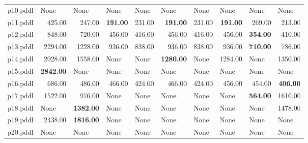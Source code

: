 \documentclass{article}
\begin{document}
\begin{tabular}{@{}lrrrrrrrrr@{}}
p10.pddl & \multicolumn{1}{|l|}{None} & \multicolumn{1}{|l|}{None} & \multicolumn{1}{|l|}{None} & \multicolumn{1}{|l|}{None} & \multicolumn{1}{|l|}{None} & \multicolumn{1}{|l|}{None} & \multicolumn{1}{|l|}{None} & \multicolumn{1}{|l|}{None} & \multicolumn{1}{|l|}{None} \\
p11.pddl & 425.00 & 247.00 & \textbf{191.00} & 231.00 & \textbf{191.00} & 231.00 & \textbf{191.00} & 269.00 & 213.00 \\
p12.pddl & 848.00 & 720.00 & 456.00 & 416.00 & 456.00 & 416.00 & 456.00 & \textbf{354.00} & 410.00 \\
p13.pddl & 2294.00 & 1228.00 & 936.00 & 838.00 & 936.00 & 838.00 & 936.00 & \textbf{710.00} & 786.00 \\
p14.pddl & 2028.00 & 1558.00 & \multicolumn{1}{|l|}{None} & \multicolumn{1}{|l|}{None} & \textbf{1280.00} & \multicolumn{1}{|l|}{None} & 1284.00 & \multicolumn{1}{|l|}{None} & 1350.00 \\
p15.pddl & \textbf{2842.00} & \multicolumn{1}{|l|}{None} & \multicolumn{1}{|l|}{None} & \multicolumn{1}{|l|}{None} & \multicolumn{1}{|l|}{None} & \multicolumn{1}{|l|}{None} & \multicolumn{1}{|l|}{None} & \multicolumn{1}{|l|}{None} & \multicolumn{1}{|l|}{None} \\
p16.pddl & 686.00 & 486.00 & 466.00 & 424.00 & 466.00 & 424.00 & 456.00 & 454.00 & \textbf{406.00} \\
p17.pddl & 1522.00 & 976.00 & \multicolumn{1}{|l|}{None} & \multicolumn{1}{|l|}{None} & \multicolumn{1}{|l|}{None} & \multicolumn{1}{|l|}{None} & \multicolumn{1}{|l|}{None} & \textbf{564.00} & 1610.00 \\
p18.pddl & \multicolumn{1}{|l|}{None} & \textbf{1382.00} & \multicolumn{1}{|l|}{None} & \multicolumn{1}{|l|}{None} & \multicolumn{1}{|l|}{None} & \multicolumn{1}{|l|}{None} & \multicolumn{1}{|l|}{None} & \multicolumn{1}{|l|}{None} & 1478.00 \\
p19.pddl & 2438.00 & \textbf{1816.00} & \multicolumn{1}{|l|}{None} & \multicolumn{1}{|l|}{None} & \multicolumn{1}{|l|}{None} & \multicolumn{1}{|l|}{None} & \multicolumn{1}{|l|}{None} & \multicolumn{1}{|l|}{None} & \multicolumn{1}{|l|}{None} \\
p20.pddl & \multicolumn{1}{|l|}{None} & \multicolumn{1}{|l|}{None} & \multicolumn{1}{|l|}{None} & \multicolumn{1}{|l|}{None} & \multicolumn{1}{|l|}{None} & \multicolumn{1}{|l|}{None} & \multicolumn{1}{|l|}{None} & \multicolumn{1}{|l|}{None} & \multicolumn{1}{|l|}{None} \\
\end{tabular}
\end{document}
